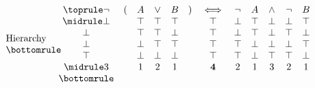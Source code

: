 \begin{myproof}
\begin{nlist}[resume]
\begin{gather*}
\begin{array}{c c}
                \multicolumn{2}{c}{\text{Hierarchy}} \\
                \bottomrule
            \end{array}
            \;
            \begin{array}{c c c c c c c c c c c c}
                \toprule
                \neg & ( & A & \vee & B & ) & \iff & \neg & A & \wedge & \neg & B \\
                \midrule
                \bot &  & \top & \top & \top &  & \top & \bot & \top & \bot & \bot & \top \\
                \bot &  & \top & \top & \bot &  & \top & \bot & \top & \bot & \top & \bot \\
                \bot &  & \bot & \top & \top &  & \top & \top & \bot & \bot & \bot & \top \\
                \top &  & \bot & \bot & \bot &  & \top & \top & \bot & \top & \top & \bot \\
                \midrule
                3 &  & 1 & 2 & 1 &  & \mathbf 4 & 2 & 1 & 3 & 2 & 1 \\
                \bottomrule
            \end{array}
        \end{gather*}


\end{nlist}
\end{myproof}
